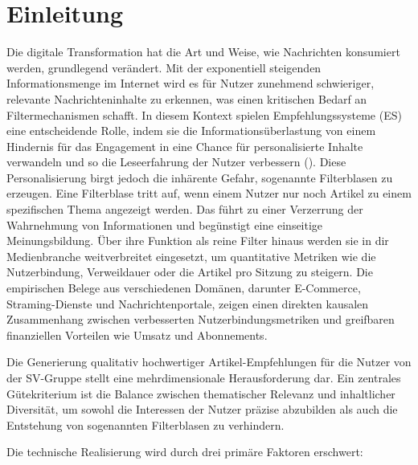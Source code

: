 \section{Einleitung}

Die digitale Transformation hat die Art und Weise, wie Nachrichten konsumiert werden, grundlegend verändert. 
Mit der exponentiell steigenden Informationsmenge im Internet wird es für Nutzer zunehmend schwieriger, 
relevante Nachrichteninhalte zu erkennen, was einen kritischen Bedarf an Filtermechanismen schafft. 
In diesem Kontext spielen Empfehlungssysteme (ES) eine entscheidende Rolle, 
indem sie die Informationsüberlastung von einem Hindernis für das Engagement in eine Chance für personalisierte 
Inhalte verwandeln und so die Leseerfahrung der Nutzer verbessern (\cite{wu_personalized_2022}).
Diese Personalisierung birgt jedoch die inhärente Gefahr, sogenannte Filterblasen zu erzeugen.
Eine Filterblase tritt auf, wenn einem Nutzer nur noch Artikel zu einem spezifischen Thema angezeigt werden. 
Das führt zu einer Verzerrung der Wahrnehmung von Informationen und begünstigt eine einseitige Meinungsbildung.
\newline
Über ihre Funktion als reine Filter hinaus werden sie in dir Medienbranche weitverbreitet eingesetzt, 
um quantitative Metriken wie die Nutzerbindung, Verweildauer oder die Artikel pro Sitzung zu steigern. 
Die empirischen Belege aus verschiedenen Domänen, darunter E-Commerce, Straming-Dienste
und Nachrichtenportale, zeigen einen direkten kausalen Zusammenhang zwischen verbesserten
Nutzerbindungsmetriken und greifbaren finanziellen Vorteilen wie Umsatz und Abonnements.

Die Generierung qualitativ hochwertiger Artikel-Empfehlungen für die Nutzer von der SV-Gruppe stellt eine mehrdimensionale Herausforderung dar. Ein zentrales Gütekriterium ist die Balance zwischen thematischer Relevanz und inhaltlicher Diversität, um sowohl die Interessen der Nutzer präzise abzubilden als auch die Entstehung von sogenannten Filterblasen zu verhindern.

Die technische Realisierung wird durch drei primäre Faktoren erschwert:


